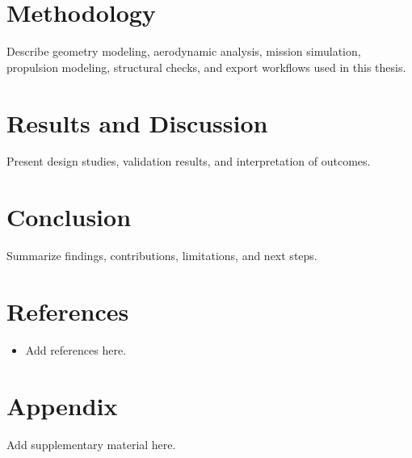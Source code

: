 \documentclass[12pt]{report}
\begin{document}
\chapter{Methodology}
Describe geometry modeling, aerodynamic analysis, mission simulation, propulsion modeling,
structural checks, and export workflows used in this thesis.

\chapter{Results and Discussion}
Present design studies, validation results, and interpretation of outcomes.

\chapter{Conclusion}
Summarize findings, contributions, limitations, and next steps.

\chapter*{References}
\begin{itemize}
  \item Add references here.
\end{itemize}

\appendix
\chapter{Appendix}
Add supplementary material here.
\end{document}
